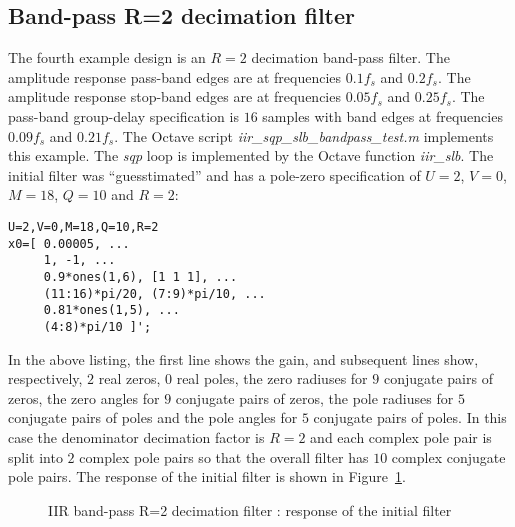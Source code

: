 \documentclass[a4paper,twoside,10pt,english]{report}
\begin{document}
\subsection{\label{sec:Band-pass-R-2-decimation-filter}Band-pass R=2 decimation filter}
The fourth example design is an $R=2$ decimation band-pass filter.
The amplitude response pass-band edges are at frequencies $0.1f_{s}$ 
and $0.2f_{s}$. The amplitude response stop-band edges are at 
frequencies $0.05f_{s}$ and $0.25f_{s}$. The pass-band 
group-delay specification is $16$ samples with band edges at
frequencies $0.09f_{s}$ and $0.21f_{s}$.
The Octave script \emph{iir\_sqp\_slb\_bandpass\_test.m} implements
this example. The \emph{sqp} loop is implemented by the Octave function 
\emph{iir\_slb}. The initial filter was ``guesstimated'' and has a pole-zero 
specification of $U=2$, $V=0$, $M=18$, $Q=10$ and $R=2$:
\begin{small}
\begin{verbatim}
U=2,V=0,M=18,Q=10,R=2
x0=[ 0.00005, ...
     1, -1, ...
     0.9*ones(1,6), [1 1 1], ...
     (11:16)*pi/20, (7:9)*pi/10, ...
     0.81*ones(1,5), ...
     (4:8)*pi/10 ]';
\end{verbatim}
\end{small}
In the above listing, the first line shows the gain, and subsequent lines show,
respectively, $2$ real zeros, $0$ real poles, the zero radiuses for $9$
conjugate pairs of zeros, the zero angles for $9$ conjugate pairs of zeros, the
pole radiuses for $5$ conjugate pairs of poles and the pole angles for $5$
conjugate pairs of poles. In this case the denominator decimation
factor is $R=2$ and each complex pole pair is split into $2$ complex pole pairs
so that the overall filter has $10$ complex conjugate pole pairs. The response of
the initial filter is shown in
Figure~\ref{fig:iir-sqp-slb-bandpass-test-initial-x0}. 
\begin{figure}[!htbp]
\begin{center}
\scalebox{0.7}{}
\caption{IIR band-pass R=2 decimation filter : response of the initial filter}
\label{fig:iir-sqp-slb-bandpass-test-initial-x0}
\end{center}
\end{figure}
\end{document}
